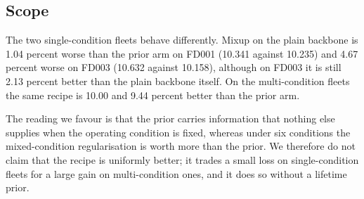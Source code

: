 
\subsection{Scope}

The two single-condition fleets behave differently. Mixup on the plain backbone is 1.04 percent worse than the prior arm on FD001 (10.341 against 10.235) and 4.67 percent worse on FD003 (10.632 against 10.158), although on FD003 it is still 2.13 percent better than the plain backbone itself. On the multi-condition fleets the same recipe is 10.00 and 9.44 percent better than the prior arm.

The reading we favour is that the prior carries information that nothing else supplies when the operating condition is fixed, whereas under six conditions the mixed-condition regularisation is worth more than the prior. We therefore do not claim that the recipe is uniformly better; it trades a small loss on single-condition fleets for a large gain on multi-condition ones, and it does so without a lifetime prior.

